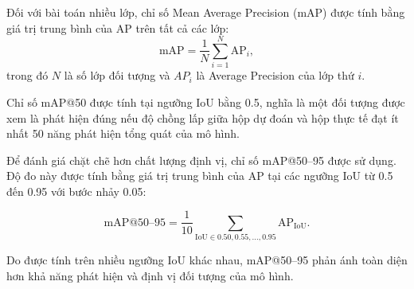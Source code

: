 Đối với bài toán nhiều lớp, chỉ số Mean Average Precision (mAP) được
tính bằng giá trị trung bình của AP trên tất cả các lớp:
\begin{equation}
  \mathrm{mAP} = \frac{1}{N}\sum_{i=1}^{N} \mathrm{AP}_i,
\end{equation}
trong đó $N$ là số lớp đối tượng và $AP_i$ là Average Precision của lớp
thứ $i$.

Chỉ số mAP@50 được tính tại ngưỡng IoU bằng 0.5, nghĩa là một đối tượng
được xem là phát hiện đúng nếu độ chồng lấp giữa hộp dự đoán và hộp thực
tế đạt ít nhất 50%
năng phát hiện tổng quát của mô hình.

Để đánh giá chặt chẽ hơn chất lượng định vị, chỉ số mAP@50--95 được sử
dụng. Độ đo này được tính bằng giá trị trung bình của AP tại các ngưỡng
IoU từ 0.5 đến 0.95 với bước nhảy 0.05:

\begin{equation}
\mathrm{mAP}@50\text{--}95
= \frac{1}{10}
\sum_{\mathrm{IoU}\in{0.50,0.55,\ldots,0.95}}
\mathrm{AP}_{\mathrm{IoU}}.
\end{equation}

Do được tính trên nhiều ngưỡng IoU khác nhau, mAP@50--95 phản ánh toàn
diện hơn khả năng phát hiện và định vị đối tượng của mô hình.
